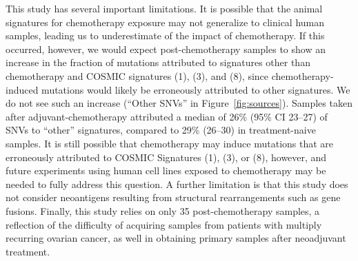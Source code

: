 This study has several important limitations. It is possible that the animal signatures for chemotherapy exposure may not generalize to clinical human samples, leading us to underestimate of the impact of chemotherapy. If this occurred, however, we would expect post-chemotherapy samples to show an increase in the fraction of mutations attributed to signatures other than chemotherapy and COSMIC signatures (1), (3), and (8), since chemotherapy-induced mutations would likely be erroneously attributed to other signatures. We do not see such an increase (``Other SNVs'' in Figure~\ref{fig:sources}). Samples taken after adjuvant-chemotherapy attributed a median of 26\% (95\% CI 23--27) of SNVs to ``other'' signatures, compared to 29\% (26--30) in treatment-naive samples. It is still possible that chemotherapy may induce mutations that are erroneously attributed to COSMIC Signatures (1), (3), or (8), however, and future experiments using human cell lines exposed to chemotherapy may be needed to fully address this question. A further limitation is that this study does not consider neoantigens resulting from structural rearrangements such as gene fusions. Finally, this study relies on only 35 post-chemotherapy samples, a reflection of the difficulty of acquiring samples from patients with multiply recurring ovarian cancer, as well in obtaining primary samples after neoadjuvant treatment.


